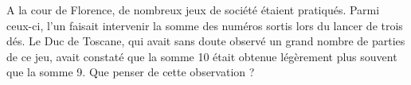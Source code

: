 
A  la  cour  de  Florence,  de  nombreux  jeux  de  société 
étaient  pratiqués.  Parmi  ceux-ci,  l’un  faisait intervenir  la  somme  des  numéros  sortis  lors  du  lancer  de  trois  dés.  Le  Duc  de  Toscane,  qui  avait  sans doute  observé  un  grand  nombre  de  parties  de  ce  jeu,  avait  constaté  que  la  somme  10  était  obtenue légèrement plus souvent que la somme 9. Que penser de cette observation ?